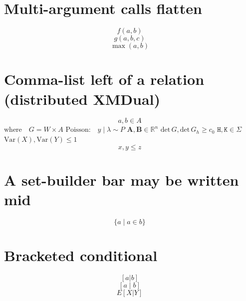 \documentclass{article}
\begin{document}
\section{Multi-argument calls flatten}
\[ f(a,b) \]
\[ g(a,b,c) \]
\[ \max(a,b) \]

\section{Comma-list left of a relation (distributed XMDual)}
\[ a,b \in A \]
$\text{where}\quad G=W\times A$ $\text{Poisson:}\quad y\mid\lambda\sim P$ $\textbf{A},\textbf{B}\in\mathbb{R}^{n}$
$\mbox{det}\,G,\mbox{det}\,G_h\geq c_0$ $\texttt{H},\texttt{K}\in\Sigma$ $\text{Var}(X),\text{Var}(Y)\leq 1$
\[ x,y \le z \]

\section{A set-builder bar may be written mid}
\[ \{ a \mid a\in b \} \]

\section{Bracketed conditional}
\[ [a|b] \]
\[ [a \mid b] \]
\[ E[X|Y] \]

\end{document}
